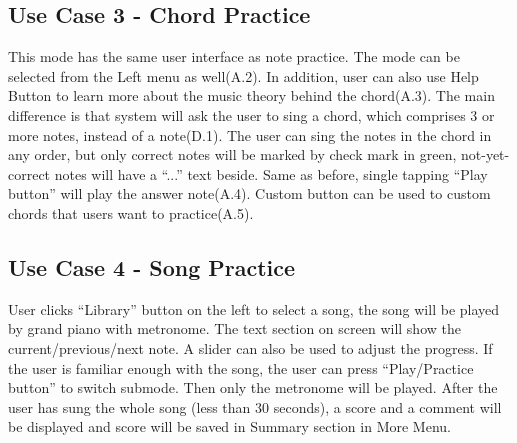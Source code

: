 \documentclass{article}
\begin{document}
\subsection{Use Case 3 - Chord Practice}
This mode has the same user interface as note practice. The mode can be selected from the Left menu as well(A.2). In addition, user can also use Help Button to learn more about the music theory behind the chord(A.3). The main difference is that system will ask the user to sing a chord, which comprises 3 or more notes, instead of a note(D.1). The user can sing the notes in the chord in any order, but only correct notes will be marked by check mark in green, not-yet-correct notes will have a “...” text beside. Same as before, single tapping “Play button” will play the answer note(A.4). Custom button can be used to custom chords that users want to practice(A.5).
\subsection{Use Case 4 - Song Practice}
User clicks “Library” button on the left to select a song, the song will be played by grand piano with metronome. The text section on screen will show the current/previous/next note. A slider can also be used to adjust the progress. If the user is familiar enough with the song, the user can press “Play/Practice button” to switch submode. Then only the metronome will be played. After the user has sung the whole song (less than 30 seconds), a score and a comment will be displayed and score will be saved in Summary section in More Menu. 
      


\end{document}
